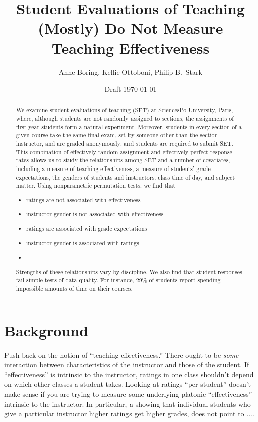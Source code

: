 \documentclass[12pt]{article}
\title{Student Evaluations of Teaching (Mostly) Do Not Measure Teaching Effectiveness}
\author{Anne Boring, Kellie Ottoboni, Philip B.~Stark}
\date{Draft \today}
\newcommand{\todo}[1]{{\color{red}{TO DO: \sc #1}}}
\begin{document}
\maketitle

\begin{abstract}
We examine student evaluations of teaching (SET) at SciencesPo
University, Paris, where, although students are not randomly assigned to sections,
the assignments of first-year students form a natural experiment.
Moreover, students in every section of a given course take the same final exam, set by
someone other than the section instructor, and are graded anonymously;
and students are required to submit SET.
This combination of effectively random assignment and effectively perfect response
rates allows us to study the relationships among SET and a number of covariates,
including a measure of teaching effectiveness, 
a measure of students' grade expectations, the genders of students and
instructors, class time of day, and subject matter.
Using nonparametric permutation tests, we find that
\begin{itemize}
   \item ratings are not associated with effectiveness
   \item instructor gender is not associated with effectiveness
   \item ratings are associated with grade expectations
   \item instructor gender is associated with ratings
   \item \todo{concordance results}
\end{itemize}
Strengths of these relationships vary by discipline.
We also find that student responses fail simple tests of data quality.
For instance, 29\% of students report spending impossible amounts of time
on their courses.

\end{abstract}

\section{Background}
Push back on the notion of ``teaching effectiveness.''
There ought to be \emph{some} interaction between characteristics of the
instructor and those of the student.
If ``effectiveness'' is intrinsic to the instructor, ratings in one class shouldn't depend on
which other classes a student takes.
Looking at ratings ``per student'' doesn't make sense if you are trying to
measure some underlying platonic ``effectiveness'' intrinsic to the instructor.
In particular,  a showing that individual students who give a particular instructor higher ratings
get higher grades, does not point to ....\todo{fix me}
\end{document}
